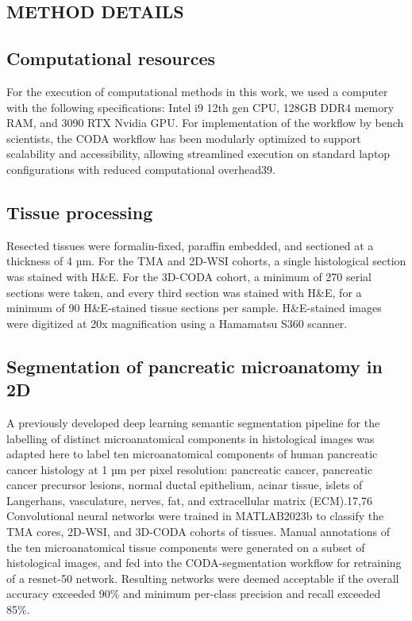 \begin{refsection}
    \section{METHOD DETAILS}
    \subsection{Computational resources}
    For the execution of computational methods in this work, we used a computer with the following specifications: Intel i9 12th gen CPU, 128GB DDR4 memory RAM, and 3090 RTX Nvidia GPU. For implementation of the workflow by bench scientists, the CODA workflow has been modularly optimized to support scalability and accessibility, allowing streamlined execution on standard laptop configurations with reduced computational overhead39. 
    
    \subsection{Tissue processing}
    Resected tissues were formalin-fixed, paraffin embedded, and sectioned at a thickness of 4 µm. For the TMA and 2D-WSI cohorts, a single histological section was stained with H\&E. For the 3D-CODA cohort, a minimum of 270 serial sections were taken, and every third section was stained with H\&E, for a minimum of 90 H\&E-stained tissue sections per sample. H\&E-stained images were digitized at 20x magnification using a Hamamatsu S360 scanner.
    
    \subsection{Segmentation of pancreatic microanatomy in 2D}
    A previously developed deep learning semantic segmentation pipeline for the labelling of distinct microanatomical components in histological images was adapted here to label ten microanatomical components of human pancreatic cancer histology at 1 µm per pixel resolution: pancreatic cancer, pancreatic cancer precursor lesions, normal ductal epithelium, acinar tissue, islets of Langerhans, vasculature, nerves, fat, and extracellular matrix (ECM).17,76 Convolutional neural networks were trained in MATLAB2023b to classify the TMA cores, 2D-WSI, and 3D-CODA cohorts of tissues. Manual annotations of the ten microanatomical tissue components were generated on a subset of histological images, and fed into the CODA-segmentation workflow for retraining of a resnet-50 network. Resulting networks were deemed acceptable if the overall accuracy exceeded 90\% and minimum per-class precision and recall exceeded 85\%.
    

\end{refsection}
